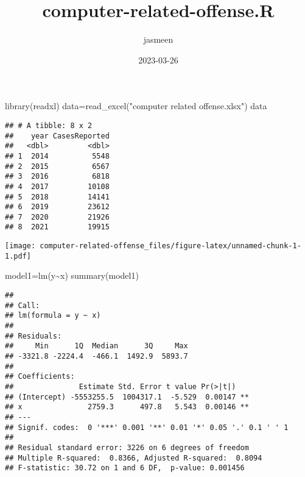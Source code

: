 \documentclass[
]{article}
\title{computer-related-offense.R}
\author{jasmeen}
\date{2023-03-26}
\newenvironment{Shaded}{\begin{snugshade}}{\end{snugshade}}
\newcommand{\AttributeTok}[1]{\textcolor[rgb]{0.77,0.63,0.00}{#1}}
\newcommand{\DecValTok}[1]{\textcolor[rgb]{0.00,0.00,0.81}{#1}}
\newcommand{\FunctionTok}[1]{\textcolor[rgb]{0.00,0.00,0.00}{#1}}
\newcommand{\NormalTok}[1]{#1}
\newcommand{\OtherTok}[1]{\textcolor[rgb]{0.56,0.35,0.01}{#1}}
\newcommand{\SpecialCharTok}[1]{\textcolor[rgb]{0.00,0.00,0.00}{#1}}
\newcommand{\StringTok}[1]{\textcolor[rgb]{0.31,0.60,0.02}{#1}}
\begin{document}
\maketitle

\begin{Shaded}
\begin{Highlighting}[]
\FunctionTok{library}\NormalTok{(readxl)}
\NormalTok{data}\OtherTok{=}\FunctionTok{read\_excel}\NormalTok{(}\StringTok{"computer related offense.xlsx"}\NormalTok{)}
\NormalTok{data}
\end{Highlighting}
\end{Shaded}

\begin{verbatim}
## # A tibble: 8 x 2
##    year CasesReported
##   <dbl>         <dbl>
## 1  2014          5548
## 2  2015          6567
## 3  2016          6818
## 4  2017         10108
## 5  2018         14141
## 6  2019         23612
## 7  2020         21926
## 8  2021         19915
\end{verbatim}

\begin{Shaded}
\end{Shaded}

\texttt{[image: computer-related-offense\_files/figure-latex/unnamed-chunk-1-1.pdf]}

\begin{Shaded}
\begin{Highlighting}[]
\NormalTok{model1}\OtherTok{=}\FunctionTok{lm}\NormalTok{(y}\SpecialCharTok{\textasciitilde{}}\NormalTok{x)}
\FunctionTok{summary}\NormalTok{(model1)}
\end{Highlighting}
\end{Shaded}

\begin{verbatim}
## 
## Call:
## lm(formula = y ~ x)
## 
## Residuals:
##     Min      1Q  Median      3Q     Max 
## -3321.8 -2224.4  -466.1  1492.9  5893.7 
## 
## Coefficients:
##               Estimate Std. Error t value Pr(>|t|)   
## (Intercept) -5553255.5  1004317.1  -5.529  0.00147 **
## x               2759.3      497.8   5.543  0.00146 **
## ---
## Signif. codes:  0 '***' 0.001 '**' 0.01 '*' 0.05 '.' 0.1 ' ' 1
## 
## Residual standard error: 3226 on 6 degrees of freedom
## Multiple R-squared:  0.8366, Adjusted R-squared:  0.8094 
## F-statistic: 30.72 on 1 and 6 DF,  p-value: 0.001456
\end{verbatim}
\end{document}
